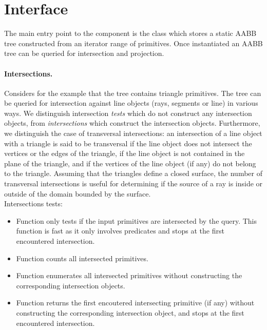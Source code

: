 \section{Interface}
\label{AABB_tree_section_interface}

The main entry point to the component is the class  which stores a static AABB tree constructed from an iterator range of primitives. Once instantiated an AABB tree can be queried for intersection and projection.


\paragraph{Intersections.} Considers for the example that the tree contains triangle primitives. The tree can be queried for intersection against line objects (rays, segments or line) in various ways. We distinguish intersection \emph{tests} which do not construct any intersection objects, from \emph{intersections} which construct the intersection objects. Furthermore, we distinguish the case of transversal intersections: an intersection of a line object with a triangle is said to be transversal if the line object does not intersect the vertices or the edges of the triangle, if the line object is not contained in the plane of the triangle, and if the vertices of the line object (if any) do not belong to the triangle. Assuming that the triangles define a closed surface, the number of transversal intersections is useful for determining if the source of a ray is inside or outside of the domain bounded by the surface.\\

Intersections tests:
\begin{itemize}
\item Function  only tests if the input primitives are intersected by the query. This function is fast as it only involves predicates and stops at the first encountered intersection.
\item Function  counts all intersected primitives.
\item Function  enumerates all intersected primitives without constructing the corresponding intersection objects.
\item Function  returns the first encoutered intersecting primitive (if any) without constructing the corresponding intersection object, and stops at the first encountered intersection.
\end{itemize}

